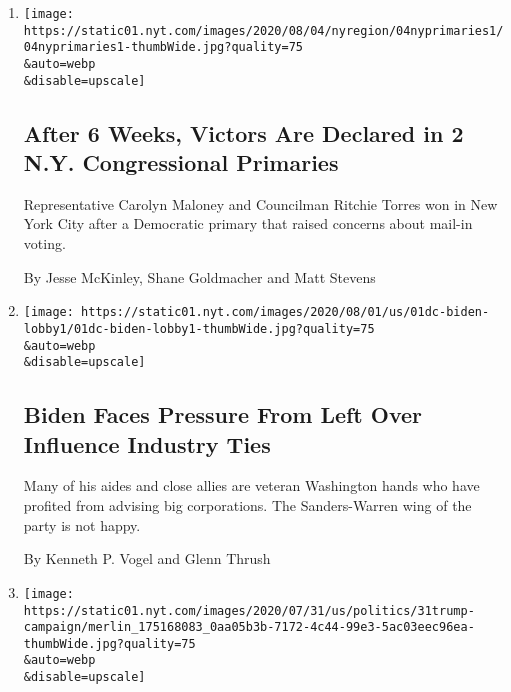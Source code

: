 \begin{enumerate}
\def\labelenumi{\arabic{enumi}.}
\item
  \href{/2020/08/04/nyregion/maloney-torres-ny-congressional-races.html}{}

  \texttt{[image: https://static01.nyt.com/images/2020/08/04/nyregion/04nyprimaries1/04nyprimaries1-thumbWide.jpg?quality=75\\\&auto=webp\\\&disable=upscale]}

  \hypertarget{after-6-weeks-victors-are-declared-in-2-ny-congressional-primaries}{%
  \subsection{After 6 Weeks, Victors Are Declared in 2 N.Y.
  Congressional
  Primaries}\label{after-6-weeks-victors-are-declared-in-2-ny-congressional-primaries}}

  Representative Carolyn Maloney and Councilman Ritchie Torres won in
  New York City after a Democratic primary that raised concerns about
  mail-in voting.

  By Jesse McKinley, Shane Goldmacher and Matt Stevens
\item
  \href{/2020/08/01/us/politics/biden-lobbyist-ties.html}{}

  \texttt{[image: https://static01.nyt.com/images/2020/08/01/us/01dc-biden-lobby1/01dc-biden-lobby1-thumbWide.jpg?quality=75\\\&auto=webp\\\&disable=upscale]}

  \hypertarget{biden-faces-pressure-from-left-over-influence-industry-ties}{%
  \subsection{Biden Faces Pressure From Left Over Influence Industry
  Ties}\label{biden-faces-pressure-from-left-over-influence-industry-ties}}

  Many of his aides and close allies are veteran Washington hands who
  have profited from advising big corporations. The Sanders-Warren wing
  of the party is not happy.

  By Kenneth P. Vogel and Glenn Thrush
\item
  \href{/2020/07/31/us/politics/trump-campaign-tv-advertising.html}{}

  \texttt{[image: https://static01.nyt.com/images/2020/07/31/us/politics/31trump-campaign/merlin\_175168083\_0aa05b3b-7172-4c44-99e3-5ac03eec96ea-thumbWide.jpg?quality=75\\\&auto=webp\\\&disable=upscale]}

  \hypertarget{trump-halts-tv-advertising-as-he-struggles-in-polls-against-biden}{%
}
\end{enumerate}

